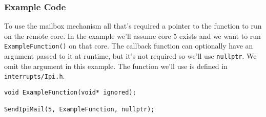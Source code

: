 \subsubsection{Example Code}
To use the mailbox mechanism all that's required a pointer to the function to run on the remote core. In the example we'll assume core 5 exists and we want to run \verb|ExampleFunction()| on that core. The callback function can optionally have an argument passed to it at runtime, but it's not required so we'll use \verb|nullptr|. We omit the argument in this example. The function we'll use is defined in \verb|interrupts/Ipi.h|.

\begin{lstlisting}
void ExampleFunction(void* ignored);

SendIpiMail(5, ExampleFunction, nullptr);
\end{lstlisting}

